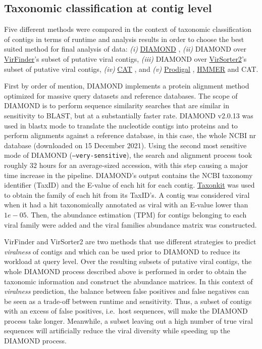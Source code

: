 \documentclass[
  openany]{book}
\begin{document}
\hypertarget{taxonomic-classification-at-contig-level}{%
\subsection{Taxonomic classification at contig level}\label{taxonomic-classification-at-contig-level}}

Five different methods were compared in the context of taxonomic classification of contigs in terms of runtime and analysis results in order to choose the best suited method for final analysis of data: \emph{(i)} \href{https://github.com/bbuchfink/diamond}{DIAMOND} \autocite{Buchfink2021}, \emph{(ii)} DIAMOND over \href{https://github.com/jessieren/VirFinder}{VirFinder}'s \autocite{Ren2017} subset of putative viral contigs, \emph{(iii)} DIAMOND over \href{https://github.com/jiarong/VirSorter2}{VirSorter2}'s \autocite{Guo2021} subset of putative viral contigs, \emph{(iv)} \href{https://github.com/dutilh/CAT}{CAT} \autocite{VonMeijenfeldt2019}, and \emph{(v)} \href{https://github.com/hyattpd/Prodigal}{Prodigal} \autocite{Hyatt2010}, \href{http://hmmer.org/}{HMMER} and CAT.

First by order of mention, DIAMOND implements a protein alignment method optimized for massive query datasets and reference databases. The scope of DIAMOND is to perform sequence similarity searches that are similar in sensitivity to BLAST, but at a substantially faster rate. DIAMOND v2.0.13 was used in blastx mode to translate the nucleotide contigs into proteins and to perform alignments against a reference database, in this case, the whole NCBI nr database (downloaded on 15 December 2021). Using the second most sensitive mode of DIAMOND (\texttt{--very-sensitive}), the search and alignment process took roughly \(32\) hours for an average-sized accession, with this step causing a major time increase in the pipeline. DIAMOND's output contains the NCBI taxonomy identifier (TaxID) and the E-value of each hit for each contig. \href{https://bioinf.shenwei.me/taxonkit/}{Taxonkit} \autocite{Shen2021} was used to obtain the family of each hit from its TaxID's. A contig was considered viral when it had a hit taxonomically annotated as viral with an E-value lower than \(1e-05\). Then, the abundance estimation (TPM) for contigs belonging to each viral family were added and the viral families abundance matrix was constructed.

VirFinder and VirSorter2 are two methods that use different strategies to predict \emph{viralness} of contigs and which can be used prior to DIAMOND to reduce its workload at query level. Over the resulting subsets of putative viral contigs, the whole DIAMOND process described above is performed in order to obtain the taxonomic information and construct the abundance matrices. In this context of \emph{viralness} prediction, the balance between false positives and false negatives can be seen as a trade-off between runtime and sensitivity. Thus, a subset of contigs with an excess of false positives, i.e.~host sequences, will make the DIAMOND process take longer. Meanwhile, a subset leaving out a high number of true viral sequences will artificially reduce the viral diversity while speeding up the DIAMOND process.
\end{document}
